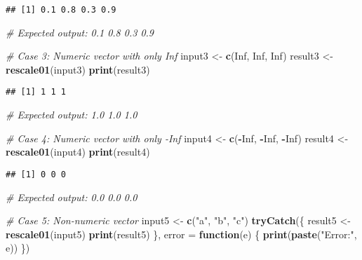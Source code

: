 \documentclass[
]{article}
\newenvironment{Shaded}{\begin{snugshade}}{\end{snugshade}}
\newcommand{\AttributeTok}[1]{\textcolor[rgb]{0.13,0.29,0.53}{#1}}
\newcommand{\CommentTok}[1]{\textcolor[rgb]{0.56,0.35,0.01}{\textit{#1}}}
\newcommand{\ConstantTok}[1]{\textcolor[rgb]{0.56,0.35,0.01}{#1}}
\newcommand{\ControlFlowTok}[1]{\textcolor[rgb]{0.13,0.29,0.53}{\textbf{#1}}}
\newcommand{\FunctionTok}[1]{\textcolor[rgb]{0.13,0.29,0.53}{\textbf{#1}}}
\newcommand{\NormalTok}[1]{#1}
\newcommand{\OtherTok}[1]{\textcolor[rgb]{0.56,0.35,0.01}{#1}}
\newcommand{\SpecialCharTok}[1]{\textcolor[rgb]{0.81,0.36,0.00}{\textbf{#1}}}
\newcommand{\StringTok}[1]{\textcolor[rgb]{0.31,0.60,0.02}{#1}}
\begin{document}
\begin{verbatim}
## [1] 0.1 0.8 0.3 0.9
\end{verbatim}

\begin{Shaded}
\begin{Highlighting}[]
\CommentTok{\# Expected output: 0.1  0.8  0.3  0.9}

\CommentTok{\# Case 3: Numeric vector with only Inf}
\NormalTok{input3 }\OtherTok{\textless{}{-}} \FunctionTok{c}\NormalTok{(}\ConstantTok{Inf}\NormalTok{, }\ConstantTok{Inf}\NormalTok{, }\ConstantTok{Inf}\NormalTok{)}
\NormalTok{result3 }\OtherTok{\textless{}{-}} \FunctionTok{rescale01}\NormalTok{(input3)}
\FunctionTok{print}\NormalTok{(result3)}
\end{Highlighting}
\end{Shaded}

\begin{verbatim}
## [1] 1 1 1
\end{verbatim}

\begin{Shaded}
\begin{Highlighting}[]
\CommentTok{\# Expected output: 1.0  1.0  1.0}

\CommentTok{\# Case 4: Numeric vector with only {-}Inf}
\NormalTok{input4 }\OtherTok{\textless{}{-}} \FunctionTok{c}\NormalTok{(}\SpecialCharTok{{-}}\ConstantTok{Inf}\NormalTok{, }\SpecialCharTok{{-}}\ConstantTok{Inf}\NormalTok{, }\SpecialCharTok{{-}}\ConstantTok{Inf}\NormalTok{)}
\NormalTok{result4 }\OtherTok{\textless{}{-}} \FunctionTok{rescale01}\NormalTok{(input4)}
\FunctionTok{print}\NormalTok{(result4)}
\end{Highlighting}
\end{Shaded}

\begin{verbatim}
## [1] 0 0 0
\end{verbatim}

\begin{Shaded}
\begin{Highlighting}[]
\CommentTok{\# Expected output: 0.0  0.0  0.0}

\CommentTok{\# Case 5: Non{-}numeric vector}
\NormalTok{input5 }\OtherTok{\textless{}{-}} \FunctionTok{c}\NormalTok{(}\StringTok{"a"}\NormalTok{, }\StringTok{"b"}\NormalTok{, }\StringTok{"c"}\NormalTok{)}
\FunctionTok{tryCatch}\NormalTok{(\{}
\NormalTok{  result5 }\OtherTok{\textless{}{-}} \FunctionTok{rescale01}\NormalTok{(input5)}
  \FunctionTok{print}\NormalTok{(result5)}
\NormalTok{\}, }\AttributeTok{error =} \ControlFlowTok{function}\NormalTok{(e) \{}
  \FunctionTok{print}\NormalTok{(}\FunctionTok{paste}\NormalTok{(}\StringTok{"Error:"}\NormalTok{, e))}
\NormalTok{\})}
\end{Highlighting}
\end{Shaded}
\end{document}
